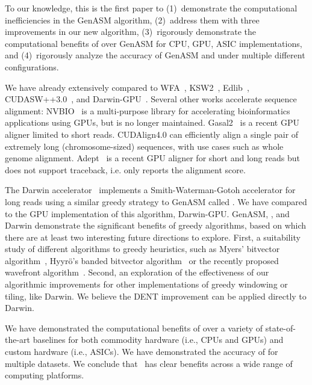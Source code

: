 To our knowledge, this is the first paper to (1)~demonstrate the computational inefficiencies in the GenASM algorithm, (2)~address them with three improvements in our new \toolname algorithm, (3)~rigorously demonstrate the computational benefits of \toolname over GenASM for CPU, GPU, ASIC implementations, and (4)~rigorously analyze the accuracy of GenASM and \toolname under multiple different configurations.

We have already extensively compared to WFA~\citep{wfa_algorithm}, KSW2~\citep{ksw2_a, ksw2_b}, Edlib~\citep{edlib}, CUDASW++3.0~\citep{liu2013cudasw++}, and Darwin-GPU~\citep{ahmed2020darwin_gpu}. Several other works accelerate sequence alignment: NVBIO~\citep{nvbio} is a multi-purpose library for accelerating bioinformatics applications using GPUs, but is no longer maintained. Gasal2~\citep{gasal2} is a recent GPU aligner limited to short reads. CUDAlign4.0 \citep{de2016cudalign} can efficiently align a single pair of extremely long (chromosome-sized) sequences, with use cases such as whole genome alignment. Adept~\citep{awan2020adept} is a recent GPU aligner for short and long reads but does not support traceback, i.e. only reports the alignment score.

The Darwin accelerator~\citep{turakhia2019darwin} implements a Smith-Waterman-Gotoh accelerator for long reads using a similar greedy strategy to GenASM called . We have compared \toolname to the GPU implementation of this algorithm, Darwin-GPU. GenASM, \toolname, and Darwin demonstrate the significant benefits of greedy algorithms, based on which there are at least two interesting future directions to explore. First, a suitability study of different algorithms to greedy heuristics, such as Myers' bitvector algorithm~\citep{myers_algorithm_1999}, Hyyrö's banded bitvector algorithm~\citep{hyyro2003bit} or the recently proposed wavefront algorithm~\citep{wfa_algorithm}. Second, an exploration of the effectiveness of our algorithmic improvements for other implementations of greedy windowing or tiling, like Darwin. We believe the DENT improvement can be applied directly to Darwin.

We have demonstrated the computational benefits of \toolname over a variety of state-of-the-art baselines for both commodity hardware (i.e., CPUs and GPUs) and custom hardware (i.e., ASICs). We have demonstrated the accuracy of \toolname for multiple datasets. We conclude that \toolname\ has clear benefits across a wide range of computing platforms.